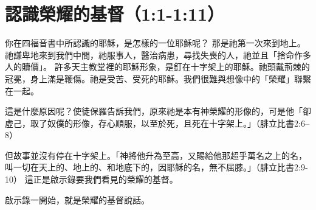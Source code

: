 \chapter{認識榮耀的基督（1:1-1:11）}

你在四福音書中所認識的耶穌，是怎樣的一位耶穌呢？
那是祂第一次來到地上。祂謙卑地來到我們中間，祂服事人，醫治病患，尋找失喪的人，祂並且「捨命作多人的贖價」。
許多天主教堂裡的耶穌形象，是釘在十字架上的耶穌。祂頭戴荊棘的冠冕，身上滿是鞭傷。祂是受苦、受死的耶穌。我們很難與想像中的「榮耀」聯繫在一起。

這是什麼原因呢？使徒保羅告訴我們，原來祂是本有神榮耀的形像的，可是他「卻虛己，取了奴僕的形像，存心順服，以至於死，且死在十字架上。」（腓立比書2:6–8）

但故事並沒有停在十字架上。「神將他升為至高，又賜給他那超乎萬名之上的名，叫一切在天上的、地上的、和地底下的，因耶穌的名，無不屈膝。」（腓立比書2:9-10）
這正是啟示錄要我們看見的榮耀的基督。

啟示錄一開始，就是榮耀的基督說話。

